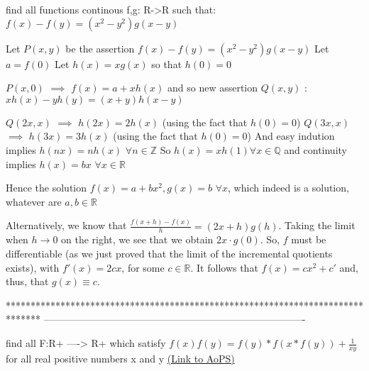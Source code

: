 \begin{solution}
	\begin{tcolorbox}find all functions continous f,g: R->R such that:
$ f(x)-f(y)=(x^{2}-y^{2})g(x-y) $\end{tcolorbox}
Let $P(x,y)$ be the assertion $f(x)-f(y)=(x^2-y^2)g(x-y)$
Let $a=f(0)$
Let $h(x)=xg(x)$ so that $h(0)=0$

$P(x,0)$ $\implies$ $f(x)=a+xh(x)$ and so new assertion $Q(x,y)$ : $xh(x)-yh(y)=(x+y)h(x-y)$

$Q(2x,x)$ $\implies$ $h(2x)=2h(x)$ (using the fact that $h(0)=0$)
$Q(3x,x)$ $\implies$ $h(3x)=3h(x)$ (using the fact that $h(0)=0$)
And easy indution implies $h(nx)=nh(x)$ $\forall n\in\mathbb Z$
So $h(x)=xh(1)$$\forall x\in\mathbb Q$ and continuity implies $h(x)=bx$ $\forall x\in\mathbb R$

Hence the solution $\boxed{f(x)=a+bx^2,g(x)=b}$ $\forall x$, which indeed is a solution, whatever are $a,b\in\mathbb R$
\end{solution}



\begin{solution}
	Alternatively, we know that $\frac{f(x+h)-f(x)}{h} = (2x+h)g(h)$. Taking the limit when $h \rightarrow 0 $ on the right, we see that we obtain $2x\cdot g(0)$. So, $f$ must be differentiable (as we just proved that the limit of the incremental quotients exists), with $f'(x)=2cx$, for some $c \in \mathbb{R}$. It follows that $f(x) = cx^2 + c'$ and, thus, that $g(x)\equiv c$.
\end{solution}
*******************************************************************************
-------------------------------------------------------------------------------

\begin{problem}
	find all F:R+ ----> R+ which satisfy $f(x)f(y) = f(y)*f(x*f(y)) +\frac{1}{xy}$ for all real positive numbers x and y
	\flushright \href{https://artofproblemsolving.com/community/c6h604094}{(Link to AoPS)}
\end{problem}



